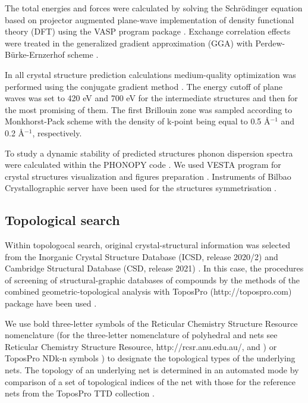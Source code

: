 \documentclass[a4paperm]{article}
\begin{document}
The total energies and forces were calculated by solving the Schr\"{o}dinger equation based on projector augmented plane-wave implementation \cite{blochl1994projector} of density functional theory (DFT) using the VASP program package \cite{vasp1,vasp2}.
Exchange correlation effects were treated in the generalized gradient approximation (GGA) with Perdew-B\"{u}rke-Ernzerhof scheme \cite{pbe}.

In all crystal structure prediction calculations medium-quality optimization was performed using the conjugate gradient method \cite{conjugate_gradient}. 
The energy cutoff of plane waves was set to 420 eV and 700 eV for the intermediate structures and then for the most promising of them. 
The first Brillouin zone was sampled according to Monkhorst-Pack scheme \cite{monkhorst1976special} with the density of k-point being equal to 0.5 \AA$^{-1}$ and 0.2 \AA$^{-1}$, respectively. 

To study a dynamic stability of predicted structures phonon dispersion spectra were calculated within the PHONOPY code \cite{phonopy}. 
We used VESTA program for crystal structures visualization and figures preparation \cite{momma2011vesta}.
Instruments of Bilbao Crystallographic server have been used for the structures symmetrisation \cite{bilbao}.


\subsection*{Topological search}

Within topologocal search, original crystal-structural information was selected from the Inorganic Crystal Structure Database (ICSD, release 2020/2) \cite{icsd_1} and Cambridge Structural Database (CSD, release 2021) \cite{icsd_2}.
In this case, the procedures of screening of structural-graphic databases of compounds by the methods of the combined geometric-topological analysis with ToposPro (http://topospro.com) package have been used \cite{topos_1}. 

We use bold three-letter symbols of the Reticular Chemistry Structure Resource nomenclature (for the three-letter nomenclature of polyhedral and nets see Reticular Chemistry Structure Resource, http://rcsr.anu.edu.au/, and \cite{rcsr}) or ToposPro NDk-n symbols \cite{rcsr_2}) to designate the topological types of the underlying nets. 
The topology of an underlying net is determined in an automated mode by comparison of a set of topological indices of the net with those for the reference nets from the ToposPro TTD collection \cite{TTD}.
\end{document}
